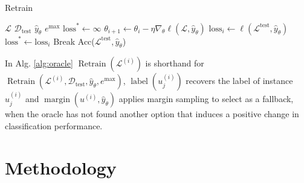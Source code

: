 \documentclass[]{article}
\begin{document}
\hspace{3mm}
\begin{minipage}{0.5\linewidth}
	\begin{algorithm}[H]
		\caption{Retrain}\label{alg:retrain}
		\begin{algorithmic}[1]
			\Require $\mathcal{L}$ 
			\Require $\mathcal{D}_\text{test}$ 
			\Require $\hat y_\theta$ 
			\Require $e^\text{max}$ 
			\State $\text{loss}^* \gets \infty$
			\State $\theta_{i+1} \gets \theta_i - \eta \nabla_\theta \ell(\mathcal{L}, \hat y_{\theta})$
			\State $\text{loss}_i \gets \ell(\mathcal{L}^\text{test}, \hat y_{\theta})$
			\State $\text{loss}^* \gets \text{loss}_i$
			\Else
			\State Break
			\EndIf
			\EndFor
			\State
			\Return Acc($\mathcal{L}^\text{test}, \hat y_{\theta}$)
		\end{algorithmic}
	\end{algorithm}
	In Alg. \ref{alg:oracle} $\operatorname{Retrain}(\mathcal{L}^{(i)})$ is shorthand for $\operatorname{Retrain}(\mathcal{L}^{(i)}, \mathcal{D}_\text{test}, \hat y_\theta, e^\text{max})$, $\operatorname{label}(u^{(i)}_{j})$ recovers the label of instance $u^{(i)}_{j}$ and $\operatorname{margin}(u^{(i)}, \hat y_\theta)$ applies margin sampling to select as a fallback, when the oracle has not found another option that induces a positive change in classification performance.
\end{minipage}


\section{Methodology}

\end{document}
